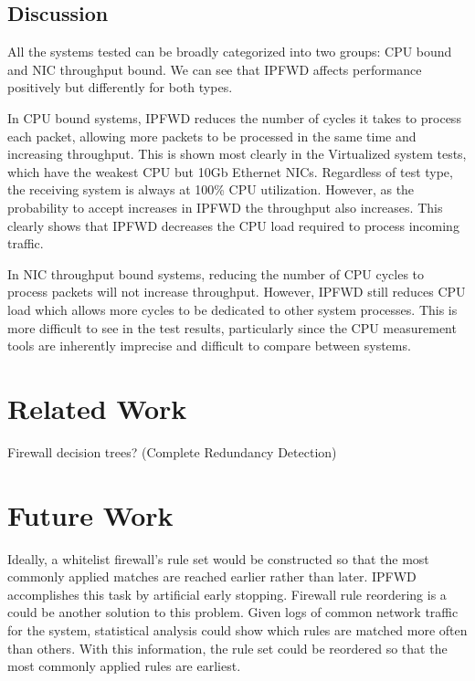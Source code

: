 \documentclass[journal]{IEEEtran}
\begin{document}
  \subsection{Discussion} 

  All the systems tested can be broadly categorized into two groups: CPU bound
  and NIC throughput bound. We can see that IPFWD affects performance
  positively but differently for both types. 

  In CPU bound systems, IPFWD reduces the number of cycles it takes to process
  each packet, allowing more packets to be processed in the same time and
  increasing throughput. This is shown most clearly in the Virtualized system
  tests, which have the weakest CPU but 10Gb Ethernet NICs. Regardless of test
  type, the receiving system is always at 100\% CPU utilization. However, as
  the probability to accept increases in IPFWD the throughput also increases.
  This clearly shows that IPFWD decreases the CPU load required to process
  incoming traffic.

  In NIC throughput bound systems, reducing the number of CPU cycles to process
  packets will not increase throughput. However, IPFWD still reduces CPU load
  which allows more cycles to be dedicated to other system processes. This is
  more difficult to see in the test results, particularly since the CPU
  measurement tools are inherently imprecise and difficult to compare between
  systems.


\section{Related Work}

Firewall decision trees? (Complete Redundancy Detection)



\section{Future Work}
Ideally, a whitelist firewall's rule set would be constructed so that the most
commonly applied matches are reached earlier rather than later. IPFWD
accomplishes this task by artificial early stopping. Firewall rule reordering
is a could be another solution to this problem. Given logs of common network
traffic for the system, statistical analysis could show which rules are matched
more often than others. With this information, the rule set could be reordered
so that the most commonly applied rules are earliest.
\end{document}
